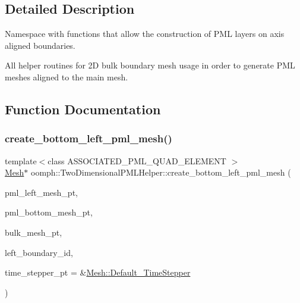 \subsection{Detailed Description}
Namespace with functions that allow the construction of P\+ML layers on axis aligned boundaries. 

All helper routines for 2D bulk boundary mesh usage in order to generate P\+ML meshes aligned to the main mesh. 

\subsection{Function Documentation}
\mbox{\label{namespaceoomph_1_1TwoDimensionalPMLHelper_aba3dace3fd7f0d481d986e6cc98c770f}} 
\subsubsection{\texorpdfstring{create\+\_\+bottom\+\_\+left\+\_\+pml\+\_\+mesh()}{create\_bottom\_left\_pml\_mesh()}}
{\footnotesize\ttfamily template$<$class A\+S\+S\+O\+C\+I\+A\+T\+E\+D\+\_\+\+P\+M\+L\+\_\+\+Q\+U\+A\+D\+\_\+\+E\+L\+E\+M\+E\+NT $>$ \\
\hyperlink{classoomph_1_1Mesh}{Mesh}$\ast$ oomph\+::\+Two\+Dimensional\+P\+M\+L\+Helper\+::create\+\_\+bottom\+\_\+left\+\_\+pml\+\_\+mesh (\begin{DoxyParamCaption}\item[{\hyperlink{classoomph_1_1Mesh}{Mesh} $\ast$}]{pml\+\_\+left\+\_\+mesh\+\_\+pt,  }\item[{\hyperlink{classoomph_1_1Mesh}{Mesh} $\ast$}]{pml\+\_\+bottom\+\_\+mesh\+\_\+pt,  }\item[{\hyperlink{classoomph_1_1Mesh}{Mesh} $\ast$}]{bulk\+\_\+mesh\+\_\+pt,  }\item[{const unsigned \&}]{left\+\_\+boundary\+\_\+id,  }\item[{\hyperlink{classoomph_1_1TimeStepper}{Time\+Stepper} $\ast$}]{time\+\_\+stepper\+\_\+pt = {\ttfamily \&\hyperlink{classoomph_1_1Mesh_a12243d0fee2b1fcee729ee5a4777ea10}{Mesh\+::\+Default\+\_\+\+Time\+Stepper}} }\end{DoxyParamCaption})}



